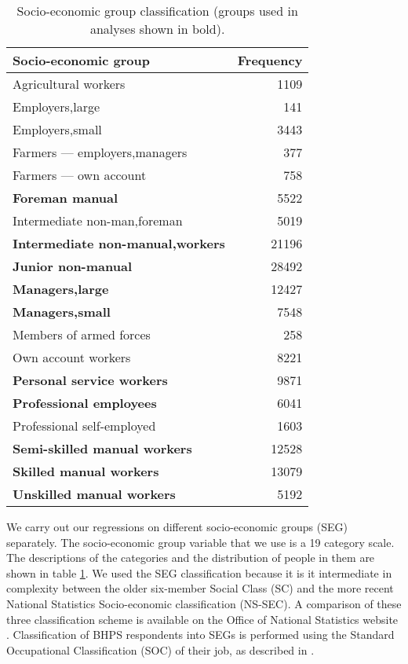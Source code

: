 \documentclass[a4paper,11pt,titlepage]{article}
\begin{document}
\begin{table}[htb]
\caption{Socio-economic group classification (groups used in analyses shown in bold).  \label{tab:SEG}}
\begin{center}
\begin{tabular}{lr}
\toprule
Socio-economic group & Frequency \\
\midrule
  Agricultural workers & 1109 \\
  Employers,large & 141 \\
  Employers,small & 3443 \\
  Farmers --- employers,managers & 377 \\
  Farmers --- own account & 758 \\
  \textbf{Foreman manual} & 5522 \\
  Intermediate non-man,foreman & 5019 \\
  \textbf{Intermediate non-manual,workers} & 21196 \\
  \textbf{Junior non-manual} & 28492 \\
  \textbf{Managers,large} & 12427 \\
  \textbf{Managers,small} & 7548 \\
  Members of armed forces & 258 \\
  Own account workers & 8221 \\
  \textbf{Personal service workers} & 9871 \\
  \textbf{Professional employees} & 6041 \\
  Professional self-employed & 1603 \\
  \textbf{Semi-skilled manual workers} & 12528 \\
  \textbf{Skilled manual workers} & 13079 \\
  \textbf{Unskilled manual workers} & 5192 \\ 
\bottomrule
\end{tabular}
\end{center}
\end{table}

We carry out our regressions on different socio-economic groups (SEG) separately. The socio-economic group variable that we use is a 19 category scale. The descriptions of the categories and the distribution of people in them are shown in table \ref{tab:SEG}. We used the SEG classification because it is it intermediate in complexity between the older six-member Social Class (SC) and the more recent National Statistics Socio-economic classification (NS-SEC).  A comparison of these three classification scheme is available on the Office of National Statistics website \citep{ONSnd}. Classification of BHPS respondents into SEGs is performed using the Standard Occupational Classification (SOC) of their job, as described in \citet{Taylor2010}.
\end{document}
